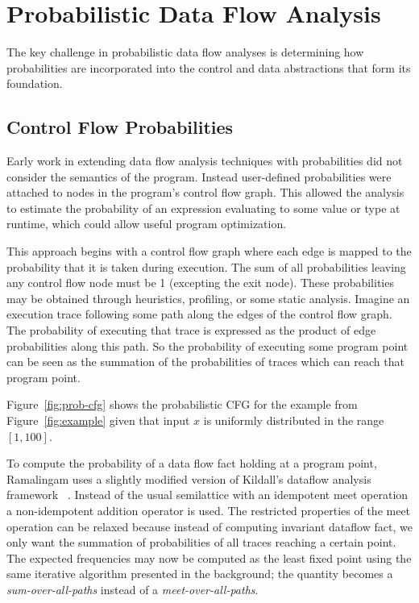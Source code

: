 \section{Probabilistic Data Flow Analysis}
\label{sec:pdfa}

The key challenge in probabilistic data flow analyses is
determining how probabilities are incorporated into the control
and data abstractions that form its foundation.

\subsection{Control Flow Probabilities}
Early work in extending data flow analysis 
techniques with probabilities did not consider
the semantics of the program. 
Instead user-defined probabilities 
were attached to nodes in the program's control flow graph.  
This allowed the analysis to estimate
the probability of an expression evaluating 
to some value or type at runtime, which could 
allow useful program optimization.

This approach begins with a control flow graph where each edge is 
mapped to the probability that it is taken during execution.
The sum of all probabilities leaving any control flow node must be 1
(excepting the exit node).
These probabilities may be obtained through heuristics, profiling,
or some static analysis.
Imagine an execution trace following some path along the edges of
the control flow graph.
The probability of executing that trace is expressed as the product of 
edge probabilities along this path.
So the probability of executing some program point can be seen as the
summation of the probabilities of traces which can reach that program point.


Figure~\ref{fig:prob-cfg} shows the probabilistic CFG for the
example from Figure~\ref{fig:example} given that input $x$
is uniformly distributed in the range $[1,100]$.

To compute the probability of a data flow fact holding 
at a program point, Ramalingam uses a slightly
modified version of Kildall's dataflow analysis framework
~\cite{ramalingam1996data}.
Instead of the usual semilattice with an idempotent meet
operation a non-idempotent addition operator is used.
The restricted properties of the meet operation can be
relaxed because instead of computing invariant dataflow
fact, we only want the summation of probabilities of all
traces reaching a certain point.
The expected frequencies may now be computed as the least
fixed point using the same iterative algorithm presented
in the background; the quantity becomes a
{\sl sum-over-all-paths} instead of a {\sl meet-over-all-paths}.

